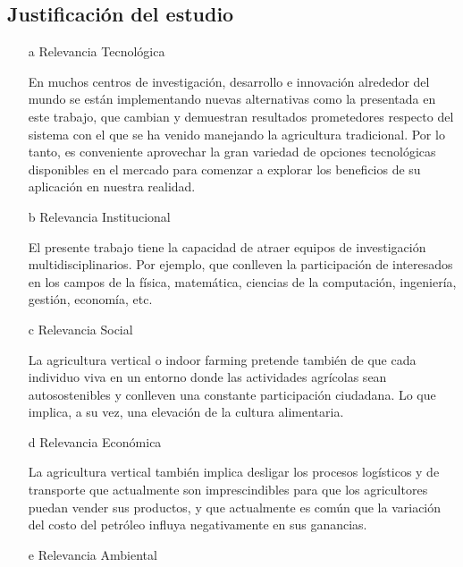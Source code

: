 \documentclass{report}
\begin{document}
\subsection{Justificación del estudio}
\begin{enumerate}
\item[a] Relevancia Tecnológica
  
  En muchos centros de investigación, desarrollo e innovación alrededor del
  mundo se están implementando nuevas alternativas como la presentada en este
  trabajo, que cambian y demuestran resultados prometedores respecto del sistema
  con el que se ha venido manejando la agricultura tradicional. Por lo tanto, es
  conveniente aprovechar la gran variedad de opciones tecnológicas disponibles
  en el mercado para comenzar a explorar los beneficios de su aplicación en
  nuestra realidad.
  
\item[b] Relevancia Institucional
  
  El presente trabajo tiene la capacidad de atraer equipos de investigación
  multidisciplinarios. Por ejemplo, que conlleven la participación de
  interesados en los campos de la física, matemática, ciencias de la
  computación, ingeniería, gestión, economía, etc.
  
\item[c] Relevancia Social
  
  La agricultura vertical o indoor farming pretende también de que cada
  individuo viva en un entorno donde las actividades agrícolas sean
  autosostenibles y conlleven una constante participación ciudadana. Lo que
  implica, a su vez, una elevación de la cultura alimentaria.
  
\item[d] Relevancia Económica
  
  La agricultura vertical también implica desligar los procesos logísticos y de
  transporte que actualmente son imprescindibles para que los agricultores
  puedan vender sus productos, y que actualmente es común que la variación del
  costo del petróleo influya negativamente en sus ganancias.
  
\item[e] Relevancia Ambiental
  

\end{enumerate}
\end{document}
